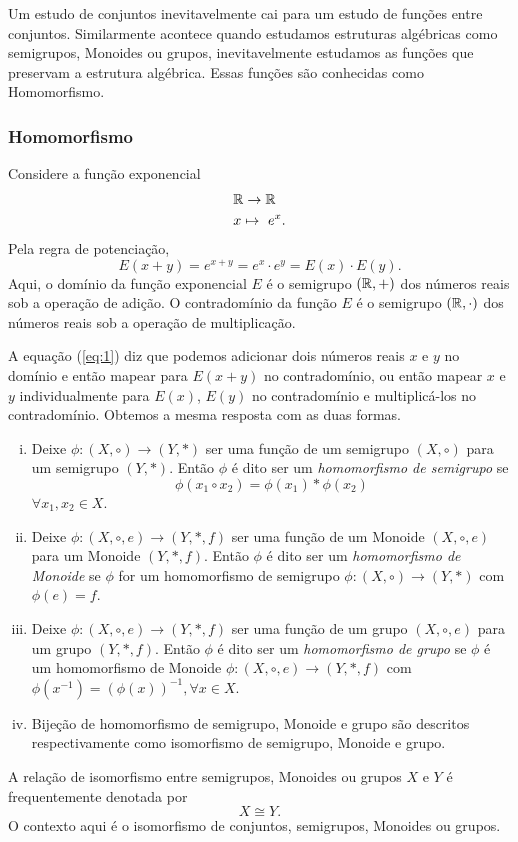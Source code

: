 Um estudo de conjuntos inevitavelmente cai para um estudo de funções entre conjuntos. Similarmente acontece quando estudamos estruturas algébricas como semigrupos, Monoides ou grupos, inevitavelmente estudamos as funções que preservam a estrutura algébrica. Essas funções são conhecidas como Homomorfismo.
\subsubsection{Homomorfismo}
Considere a função exponencial
\begin{alignat}{2}
  &\mathbb{R} \to \mathbb{R} \nonumber\\
  &x \mapsto\ e^{x}.
  \nonumber
\end{alignat}
Pela regra de potenciação,
\begin{equation}\label{eq:1}
  E(x+y)=e^{x+y} = e^{x}\cdot e^{y} = E(x)\cdot E(y).  
\end{equation}
Aqui, o domínio da função exponencial $E$ é o semigrupo $(\mathbb{R},+)$ dos números reais sob a operação de adição. O contradomínio da função $E$ é o semigrupo $(\mathbb{R},\cdot)$ dos números reais sob a operação de multiplicação.

A equação (\ref{eq:1}) diz que podemos adicionar dois números reais $x$ e $y$ no domínio e então mapear para $E(x+y)$ no contradomínio, ou então mapear $x$ e $y$ individualmente para $E(x)$, $E(y)$ no contradomínio e multiplicá-los no contradomínio. Obtemos a mesma resposta com as duas formas.

\begin{definition}
  \begin{enumerate}[i.]
    Homomorfismo e isomorfismo.
    \item Deixe $\phi: (X, \circ) \to (Y, *)$ ser uma função de um semigrupo $(X, \circ)$ para um semigrupo $(Y,*)$. Então $\phi$ é dito ser um \emph{homomorfismo de semigrupo} se $$\phi(x_{1}\circ x_{2}) = \phi(x_{1}) * \phi(x_{2})$$ $\forall x_{1},x_{2} \in X$.
    \item Deixe $\phi: (X,\circ, e) \to (Y, *, f)$ ser uma função de um Monoide $(X, \circ , e)$ para um Monoide $(Y, *, f)$. Então $\phi$ é dito ser um \emph{homomorfismo de Monoide} se $\phi$ for um homomorfismo de semigrupo $\phi: (X,\circ) \to (Y,*)$ com $\phi(e) = f$.
    \item Deixe $\phi: (X,\circ , e) \to (Y, *, f)$ ser uma função de um grupo $(X,\circ, e)$ para um grupo $(Y, *, f)$. Então $\phi$ é dito ser um \emph{homomorfismo de grupo} se $\phi$ é um homomorfismo de Monoide $\phi: (X,\circ, e) \to (Y, *, f)$ com $\phi(x^{-1}) = (\phi(x))^{-1}, \forall x \in X$.
    \item Bijeção de homomorfismo de semigrupo, Monoide e grupo são descritos respectivamente como isomorfismo de semigrupo, Monoide e grupo.
  \end{enumerate}
  
\end{definition}
A relação de isomorfismo entre semigrupos, Monoides ou grupos $X$ e $Y$ é frequentemente denotada por $$X\cong Y.$$ O contexto aqui é o isomorfismo de conjuntos, semigrupos, Monoides ou grupos.


